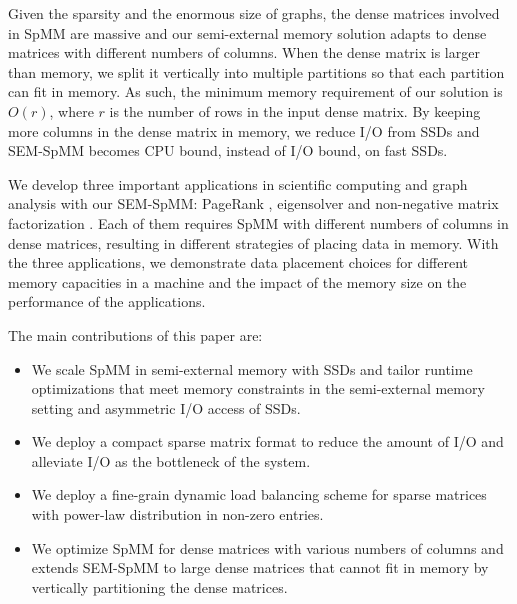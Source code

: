 Given the sparsity and the enormous size of graphs, the dense matrices involved
in SpMM are massive and our semi-external memory solution adapts to
dense matrices with different numbers of columns. When the dense matrix is
larger than memory, we split it
vertically into multiple partitions so that each partition can fit in
memory. As such, the minimum memory requirement of our solution is $O(r)$,
where $r$ is the number of rows in the input dense matrix. By keeping more columns
in the dense matrix in memory, we reduce I/O from SSDs and SEM-SpMM becomes
CPU bound, instead of I/O bound, on fast SSDs.

We develop three important applications in scientific computing and graph
analysis
with our SEM-SpMM: PageRank \cite{pagerank}, eigensolver \cite{anasazi} and
non-negative matrix factorization \cite{nmf}. Each of them requires SpMM with
different numbers of columns in dense matrices, resulting in different
strategies of placing data in memory. With the three applications, we
demonstrate data placement choices for different memory capacities in a machine
and the impact of the memory size on the performance of the applications.


The main contributions of this paper are:
\begin{itemize}
	\item We scale SpMM in semi-external memory with SSDs and tailor runtime
		optimizations that meet memory constraints in the semi-external memory
		setting and asymmetric I/O access of SSDs.
	\item We deploy a compact sparse matrix format to reduce the amount of
		I/O and alleviate I/O as the bottleneck of the system.
	\item We deploy a fine-grain dynamic load balancing scheme for sparse
		matrices with power-law distribution in non-zero entries.
	\item We optimize SpMM for dense matrices with various numbers of columns
		and extends SEM-SpMM to large dense matrices that cannot fit in memory
		by vertically partitioning the dense matrices.
\end{itemize}

